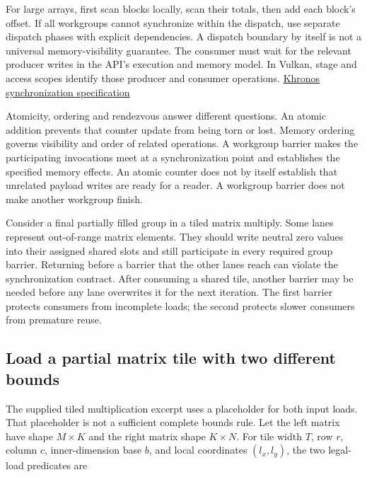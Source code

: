 For large arrays, first scan blocks locally, scan their totals, then add each block's offset. If all workgroups cannot synchronize within the dispatch, use separate dispatch phases with explicit dependencies. A dispatch boundary by itself is not a universal memory-visibility guarantee. The consumer must wait for the relevant producer writes in the API's execution and memory model. In Vulkan, stage and access scopes identify those producer and consumer operations. \href{https://docs.vulkan.org/spec/latest/chapters/synchronization.html}{Khronos synchronization specification}


Atomicity, ordering and rendezvous answer different questions. An atomic addition prevents that counter update from being torn or lost. Memory ordering governs visibility and order of related operations. A workgroup barrier makes the participating invocations meet at a synchronization point and establishes the specified memory effects. An atomic counter does not by itself establish that unrelated payload writes are ready for a reader. A workgroup barrier does not make another workgroup finish.

Consider a final partially filled group in a tiled matrix multiply. Some lanes represent out-of-range matrix elements. They should write neutral zero values into their assigned shared slots and still participate in every required group barrier. Returning before a barrier that the other lanes reach can violate the synchronization contract. After consuming a shared tile, another barrier may be needed before any lane overwrites it for the next iteration. The first barrier protects consumers from incomplete loads; the second protects slower consumers from premature reuse.

\subsection{Load a partial matrix tile with two different bounds}\label{01-foundations-i-ch008-load-a-partial-matrix-tile-with-two-different-bounds}

\hypertarget{01-foundations-i-ch008-load-a-partial-matrix-tile-with-two-different-bounds}{}

The supplied tiled multiplication excerpt uses a placeholder  for both input loads. That placeholder is not a sufficient complete bounds rule. Let the left matrix have shape \(M\times K\) and the right matrix shape \(K\times N\). For tile width \(T\), row \(r\), column \(c\), inner-dimension base \(b\), and local coordinates \((l_x,l_y)\), the two legal-load predicates are

